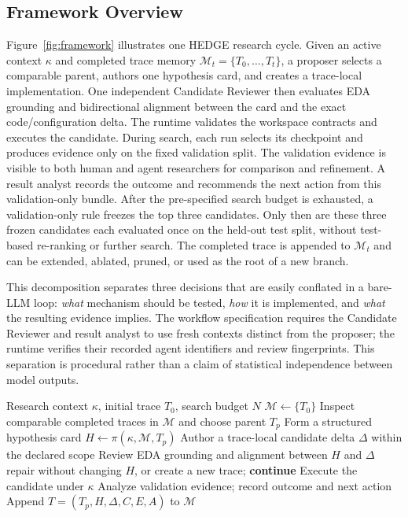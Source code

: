 \subsection{Framework Overview}
\label{sec:framework_overview}

Figure~\ref{fig:framework} illustrates one HEDGE research cycle. Given an active context $\kappa$ and completed trace memory $\mathcal{M}_t=\{T_0,\ldots,T_t\}$, a proposer selects a comparable parent, authors one hypothesis card, and creates a trace-local implementation. One independent Candidate Reviewer then evaluates EDA grounding and bidirectional alignment between the card and the exact code/configuration delta. The runtime validates the workspace contracts and executes the candidate. During search, each run selects its checkpoint and produces evidence only on the fixed validation split. The validation evidence is visible to both human and agent researchers for comparison and refinement. A result analyst records the outcome and recommends the next action from this validation-only bundle. After the pre-specified search budget is exhausted, a validation-only rule freezes the top three candidates. Only then are these three frozen candidates each evaluated once on the held-out test split, without test-based re-ranking or further search. The completed trace is appended to $\mathcal{M}_t$ and can be extended, ablated, pruned, or used as the root of a new branch.

This decomposition separates three decisions that are easily conflated in a bare-LLM loop: \emph{what} mechanism should be tested, \emph{how} it is implemented, and \emph{what} the resulting evidence implies. The workflow specification requires the Candidate Reviewer and result analyst to use fresh contexts distinct from the proposer; the runtime verifies their recorded agent identifiers and review fingerprints. This separation is procedural rather than a claim of statistical independence between model outputs.

\begin{algorithm}[t]
\caption{Protocol-Grounded Semantic Exploration in \sysname}
\label{alg:hedge_loop}
\begin{algorithmic}[1]
\REQUIRE Research context $\kappa$, initial trace $T_0$, search budget $N$
\STATE $\mathcal{M}\leftarrow\{T_0\}$
    \STATE Inspect comparable completed traces in $\mathcal{M}$ and choose parent $T_p$
    \STATE Form a structured hypothesis card $H\leftarrow\pi(\kappa,\mathcal{M},T_p)$
    \STATE Author a trace-local candidate delta $\Delta$ within the declared scope
    \STATE Review EDA grounding and alignment between $H$ and $\Delta$
        \STATE repair without changing $H$, or create a new trace; \textbf{continue}
    \ENDIF
    \STATE Execute the candidate under $\kappa$
    \STATE Analyze validation evidence; record outcome and next action
    \STATE Append $T=(T_p,H,\Delta,C,E,A)$ to $\mathcal{M}$
\ENDFOR
\end{algorithmic}
\end{algorithm}

